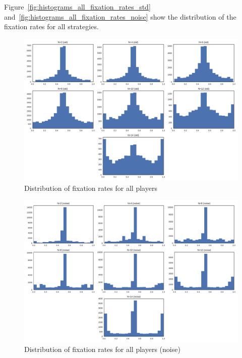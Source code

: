 \documentclass{article}
\begin{document}
Figure~\ref{fig:histograms_all_fixation_rates_std}
and~\ref{fig:histograms_all_fixation_rates_noise} show the distribution of the
fixation rates for all strategies.

\begin{figure}[!hbtp]
    \centering
    \includegraphics[width=.8\textwidth]{../img/histograms_all_fixation_rates_std.pdf}
    \caption{Distribution of fixation rates for all players}
\end{figure}

\begin{figure}[!hbtp]
    \centering
    \includegraphics[width=.8\textwidth]{../img/histograms_all_fixation_rates_noise.pdf}
    \caption{Distribution of fixation rates for all players (noise)}
\end{figure}
\end{document}
